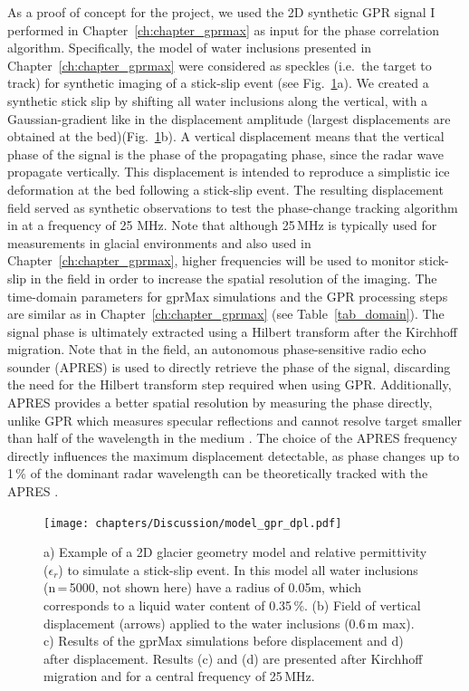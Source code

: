 As a proof of concept for the project, we used the 2D synthetic GPR signal I performed in Chapter~\ref{ch:chapter_gprmax} as input for the phase correlation algorithm. Specifically, the model of water inclusions presented in Chapter~\ref{ch:chapter_gprmax} were considered as speckles (i.e.\ the target to track) for synthetic imaging of a stick-slip event (see Fig.~\ref{fig:GPR_geometrie_dpl}a). We created a synthetic stick slip by shifting all water inclusions along the vertical, with a Gaussian-gradient like in the displacement amplitude (largest displacements are obtained at the bed)(Fig.~\ref{fig:GPR_geometrie_dpl}b). A vertical displacement means that the vertical phase of the signal is the phase of the propagating phase, since the radar wave propagate vertically. This displacement is intended to reproduce a simplistic ice deformation at the bed following a stick-slip event. The resulting displacement field served as synthetic observations to test the phase-change tracking algorithm in \cite{Aichele2019} at a frequency of 25 MHz. Note that although 25\,MHz is typically used for measurements in glacial environments and also used in Chapter~\ref{ch:chapter_gprmax}, higher frequencies will be used to monitor stick-slip in the field in order to increase the spatial resolution of the imaging. The time-domain parameters for gprMax simulations and the GPR processing steps are similar as in Chapter~\ref{ch:chapter_gprmax} (see Table~\ref{tab_domain}). The signal phase is ultimately extracted using a Hilbert transform after the Kirchhoff migration. Note that in the field, an autonomous phase-sensitive radio echo sounder (APRES) is used to directly retrieve the phase of the signal, discarding the need for the Hilbert transform step required when using GPR. Additionally, APRES provides a better spatial resolution by measuring the phase directly, unlike GPR which measures specular reflections and cannot resolve target smaller than half of the wavelength in the medium \citep{Davis&Annan1989}. The choice of the APRES frequency directly influences the maximum displacement detectable, as phase changes up to 1\,\% of the dominant radar wavelength can be theoretically tracked with the APRES \citep{Nicholls&al2015}. 



\begin{figure}[h]
    \centering
    \texttt{[image: chapters/Discussion/model\_gpr\_dpl.pdf]}
    \caption{a) Example of a 2D glacier geometry model and relative permittivity ($\epsilon_r$) to simulate a stick-slip event. In this model all water inclusions (n\,=\,5000, not shown here) have a radius of 0.05m, which corresponds to a liquid water content of 0.35\,\%. (b) Field of vertical displacement (arrows) applied to the water inclusions (0.6\,m max). c) Results of the gprMax simulations before displacement and d) after displacement. Results (c) and (d) are presented after Kirchhoff migration and for a central frequency of 25\,MHz.}
    \label{fig:GPR_geometrie_dpl}
\end{figure}

